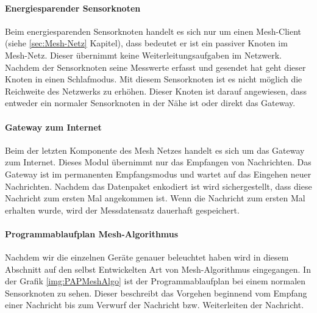 \paragraph{Energiesparender Sensorknoten} Beim energiesparenden Sensorknoten handelt es sich nur um einen Mesh-Client (siehe \ref{sec:Mesh-Netz} Kapitel), dass bedeutet er ist ein passiver Knoten im Mesh-Netz. Dieser übernimmt keine Weiterleitungsaufgaben im Netzwerk. Nachdem der Sensorknoten seine Messwerte erfasst und gesendet hat geht dieser Knoten in einen Schlafmodus. Mit diesem Sensorknoten ist es nicht möglich die Reichweite des Netzwerks zu erhöhen. Dieser Knoten ist darauf angewiesen, dass entweder ein normaler Sensorknoten in der Nähe ist oder direkt das Gateway.
\paragraph{Gateway zum Internet} Beim der letzten Komponente des Mesh Netzes handelt es sich um das Gateway zum Internet. Dieses Modul übernimmt nur das Empfangen von Nachrichten. Das Gateway ist im permanenten Empfangsmodus und wartet auf das Eingehen neuer Nachrichten. Nachdem das Datenpaket enkodiert ist wird sichergestellt, dass diese Nachricht zum ersten Mal angekommen ist. Wenn die Nachricht zum ersten Mal erhalten wurde, wird der Messdatensatz dauerhaft gespeichert. 
\paragraph{Programmablaufplan Mesh-Algorithmus} Nachdem wir die einzelnen Geräte genauer beleuchtet haben wird in diesem Abschnitt auf den selbst Entwickelten Art von Mesh-Algorithmus eingegangen. In der Grafik \ref{img:PAPMeshAlgo} ist der Programmablaufplan bei einem normalen Sensorknoten zu sehen. Dieser beschreibt das Vorgehen beginnend vom Empfang einer Nachricht bis zum Verwurf der Nachricht bzw. Weiterleiten der Nachricht. 

